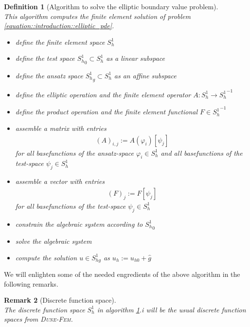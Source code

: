 \documentclass[a4paper,11pt]{article}
\numberwithin{equation}{section}
\newtheorem{definition}{Definition}[section]
\newtheorem{remark}[definition]{Remark}
\newcommand{\theoremNewline}{\hspace{1mm}\\}
\newcommand{\theoremEndLine}{\hspace{1mm}}
\newcommand{\dunefem}{\textsc{Dune-Fem}\xspace}
\begin{document}
    \begin{definition}[Algorithm to solve the elliptic boundary value problem]\theoremNewline
      \label{definition::introduction::algorithm_fem}
      This algorithm computes the finite element solution of problem
      \eqref{equation::introduction::elliptic_pde}.
      \begin{itemize}
        \item[$(i)$] define the finite element space $S_{h}^{1}$
        \item[$(ii)$] define the test space ${S_{h}^{1}}_{0} \subset S_{h}^{1}$ as a linear subspace
        \item[$(iii)$] define the ansatz space ${S_{h}^{1}}_{g} \subset S_{h}^{1}$ as an affine subspace
        \item[$(iv)$] define the elliptic operation and the finite element operator ${A: {S_{h}^{1}} \rightarrow {S_{h}^{1}}^{-1}}$
        \item[$(v)$] define the product operation and the finite element functional ${F \in {S_{h}^{1}}^{-1}}$
        \item[$(vi)$] assemble a matrix with entries
          \begin{align}
            \label{equation::introduction::matrix_entries}
            (A)_{i,j} := A( \varphi_{i} )[ \psi_j ]
          \end{align}
          for all basefunctions of the ansatz-space ${\varphi_i \in S_{h}^1}$ and all basefunctions of the test-space
          ${\psi_j \in S_h^1}$
        \item[$(vii)$] assemble a vector with entries
          \begin{align}
            \label{equation::introduction::vector_entries}
            (F)_{j} := F[ \psi_j ]
          \end{align}
          for all basefunctions of the test-space ${\psi_j \in S_h^1}$
        \item[$(viii)$] constrain the algebraic system according to ${S_h^1}_0$
        \item[$(ix)$] solve the algebraic system
        \item[$(x)$] compute the solution ${u \in S_{hg}^{1}}$ as $u_h := u_{h0} + \hat{g}$
      \end{itemize}
    \end{definition}

    We will enlighten some of the needed engredients of the above algorithm in the following remarks.

    \begin{remark}[Discrete function space]\theoremNewline
      \label{remark::introduction::discrete_function_space}
      The discrete function space $S_{h}^{1}$ in algorithm \ref{definition::introduction::algorithm_fem}.i will be the
      usual discrete function spaces from \dunefem.
    \end{remark}\theoremEndLine
\end{document}
